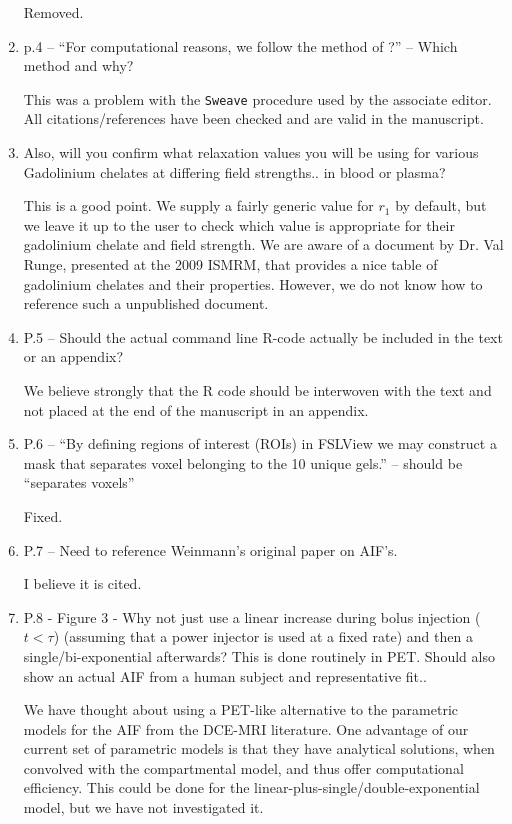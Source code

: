 \documentclass[11pt]{article}
\begin{document}
\begin{enumerate}
  Removed.

\item p.4 – ``For computational reasons, we follow the method of ?'' –
  Which method and why?

  This was a problem with the \texttt{Sweave} procedure used by the
  associate editor.  All citations/references have been checked and
  are valid in the manuscript.

\item Also, will you confirm what relaxation values you will be using
  for various Gadolinium chelates at differing field strengths.. in
  blood or plasma?

  This is a good point.  We supply a fairly generic value for $r_1$ by
  default, but we leave it up to the user to check which value is
  appropriate for their gadolinium chelate and field strength.  We are
  aware of a document by Dr. Val Runge, presented at the 2009 ISMRM,
  that provides a nice table of gadolinium chelates and their
  properties.  However, we do not know how to reference such a
  unpublished document.

\item P.5 – Should the actual command line R-code actually be included
  in the text or an appendix?

  We believe strongly that the \textsf{R} code should be interwoven
  with the text and not placed at the end of the manuscript in an
  appendix.

\item P.6 – ``By defining regions of interest (ROIs) in FSLView we may
  construct a mask that separates voxel belonging to the 10 unique
  gels.'' – should be ``separates voxels''

  Fixed.

\item P.7 – Need to reference Weinmann’s original paper on AIF's.

  I believe it is cited.

\item P.8 - Figure 3 - Why not just use a linear increase during bolus
  injection ($t<\tau$) (assuming that a power injector is used at a
  fixed rate) and then a single/bi-exponential afterwards?  This is
  done routinely in PET.  Should also show an actual AIF from a human
  subject and representative fit..

  We have thought about using a PET-like alternative to the parametric
  models for the AIF from the DCE-MRI literature.  One advantage of
  our current set of parametric models is that they have analytical
  solutions, when convolved with the compartmental model, and thus
  offer computational efficiency.  This could be done for the
  linear-plus-single/double-exponential model, but we have not
  investigated it.


\end{enumerate}
\end{document}
